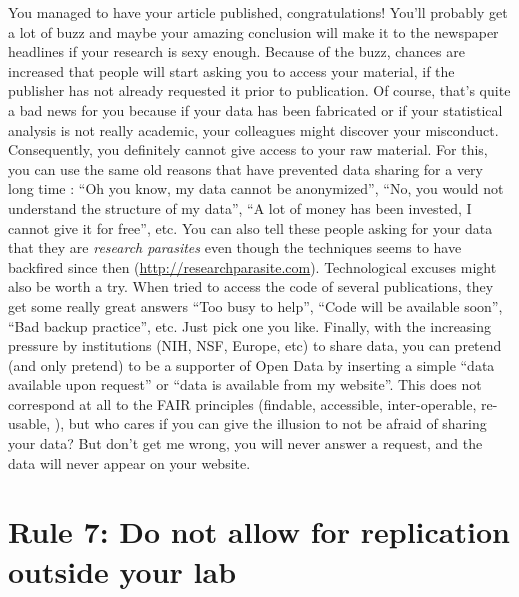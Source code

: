 \documentclass[a4paper,10pt,onecolumn]{article}
\begin{document}
You managed to have your article published, congratulations! You'll probably
get a lot of buzz and maybe your amazing conclusion will make it to the
newspaper headlines if your research is sexy enough. Because of the buzz,
chances are increased that people will start asking you to access your
material, if the publisher has not already requested it prior to
publication. Of course, that's quite a bad news for you because if your data
has been fabricated or if your statistical analysis is not really academic,
your colleagues might discover your misconduct. Consequently, you definitely
cannot give access to your raw material. For this, you can use the same old
reasons that have prevented data sharing for a very long time
\citep{roche:2014}: ``Oh you know, my data cannot be anonymized'', ``No, you
would not understand the structure of my data'', ``A lot of money has been
invested, I cannot give it for free'', etc. You can also tell these people
asking for your data that they are {\em research parasites} \citep{longo:2016}
even though the techniques seems to have backfired since then
(\url{http://researchparasite.com}).  Technological excuses might also be worth
a try. When \citep{collberg:2014,collberg:2015} tried to access the code of
several publications, they get some really great answers ``Too busy to help'',
``Code will be available soon'', ``Bad backup practice'', etc. Just pick one
you like. Finally, with the increasing pressure by institutions (NIH, NSF,
Europe, etc) to share data, you can pretend (and only pretend) to be a
supporter of Open Data by inserting a simple ``data available upon request'' or
``data is available from my website''. This does not correspond at all to the
FAIR principles (findable, accessible, inter-operable, re-usable,
\cite{wilkinson:2016}), but who cares if you can give the illusion to not be
afraid of sharing your data? But don't get me wrong, you will never answer a
request, and the data will never appear on your website.

\section*{Rule 7: Do not allow for replication outside your lab}
\end{document}
